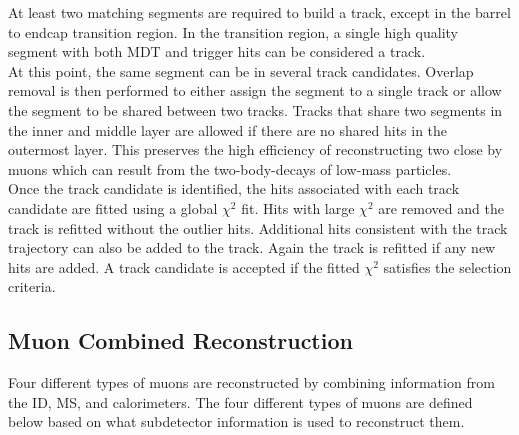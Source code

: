 \indent At least two matching segments are required to build a track, except in the barrel to endcap transition region.  In the transition region, a single high quality segment with both MDT and trigger hits can be considered a track. \\

\indent At this point, the same segment can be in several track candidates.  Overlap removal is then performed to either assign the segment to a single track or allow the segment to be shared between two tracks.  Tracks that share two segments in the inner and middle layer are allowed if there are no shared hits in the outermost layer.  This preserves the high efficiency of reconstructing two close by muons which can result from the two-body-decays of low-mass particles.  \\

\indent Once the track candidate is identified, the hits associated with each track candidate are fitted using a global $\chi^2$ fit.  Hits with large $\chi^2$ are removed and the track is refitted without the outlier hits.  Additional hits consistent with the track trajectory can also be added to the track.  Again the track is refitted if any new hits are added.  A track candidate is accepted if the fitted $\chi^2$ satisfies the selection criteria.  \\

\subsection{Muon Combined Reconstruction}
\label{sec:reco:MuonComb}

\indent Four different types of muons are reconstructed by combining information from the ID, MS, and calorimeters.  The four different types of muons are defined below based on what subdetector information is used to reconstruct them. \\

